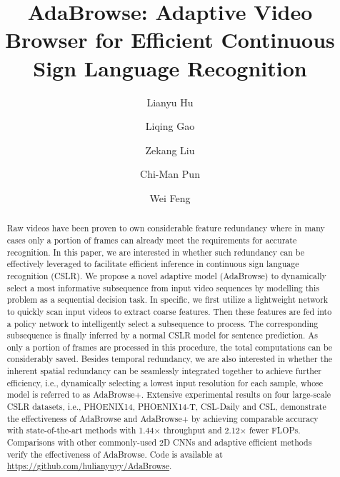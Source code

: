 \documentclass[sigconf]{acmart}
\begin{document}
\title{AdaBrowse: Adaptive Video Browser for Efficient Continuous Sign Language Recognition}



\author{Lianyu Hu}


\author{Liqing Gao}

\author{Zekang Liu}

\author{Chi-Man Pun}

\author{Wei Feng}
\renewcommand{\shortauthors}{Lianyu Hu, Liqing Gao, Zekang Liu, Chi-Man Pun, Wei Feng}

\begin{abstract}
Raw videos have been proven to own considerable feature redundancy where in many cases only a portion of frames can already meet the requirements for accurate recognition. In this paper, we are interested in whether such redundancy can be effectively leveraged to facilitate efficient inference in continuous sign language recognition (CSLR). We propose a novel adaptive model (AdaBrowse) to dynamically select a most informative subsequence from input video sequences by modelling this problem as a sequential decision task. In specific, we first utilize a lightweight network to quickly scan input videos to extract coarse features. Then these features are fed into a policy network to intelligently select a subsequence to process. The corresponding subsequence is finally inferred by a normal CSLR model for sentence prediction. As only a portion of frames are processed in this procedure, the total computations can be considerably saved. Besides temporal redundancy, we are also interested in whether the inherent spatial redundancy can be seamlessly integrated together to achieve further efficiency, i.e., dynamically selecting a lowest input resolution for each sample, whose model is referred to as AdaBrowse+. Extensive experimental results on four large-scale CSLR datasets, i.e., PHOENIX14, PHOENIX14-T, CSL-Daily and CSL, demonstrate the effectiveness of AdaBrowse and AdaBrowse+ by achieving comparable accuracy with state-of-the-art methods with 1.44$\times$ throughput and 2.12$\times$ fewer FLOPs. Comparisons with other commonly-used 2D CNNs and adaptive efficient methods verify the effectiveness of AdaBrowse. Code is available at \url{https://github.com/hulianyuyy/AdaBrowse}.
\end{abstract}
\end{document}
